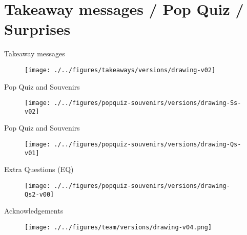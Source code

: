 \section{Takeaway messages / Pop Quiz / Surprises }



{
\begin{frame}{Takeaway messages}
  \begin{figure}
  \centering
  \texttt{[image: ./../figures/takeaways/versions/drawing-v02]}
  \end{figure}

\end{frame}
}

{
\begin{frame}{Pop Quiz and Souvenirs}
  \begin{figure}
  \centering
  \texttt{[image: ./../figures/popquiz-souvenirs/versions/drawing-Ss-v02]}
  \end{figure}

\end{frame}
}


{
\begin{frame}{Pop Quiz and Souvenirs}
  \begin{figure}
  \centering
  \texttt{[image: ./../figures/popquiz-souvenirs/versions/drawing-Qs-v01]}
  \end{figure}

\end{frame}
}


{
\begin{frame}{Extra Questions (EQ)}
  \begin{figure}
  \centering
  \texttt{[image: ./../figures/popquiz-souvenirs/versions/drawing-Qs2-v00]}
  \end{figure}

\end{frame}
}



{
\begin{frame}{Acknowledgements}

  \begin{figure}
  \centering
  \texttt{[image: ./../figures/team/versions/drawing-v04.png]}
  \end{figure}

\end{frame}
}
